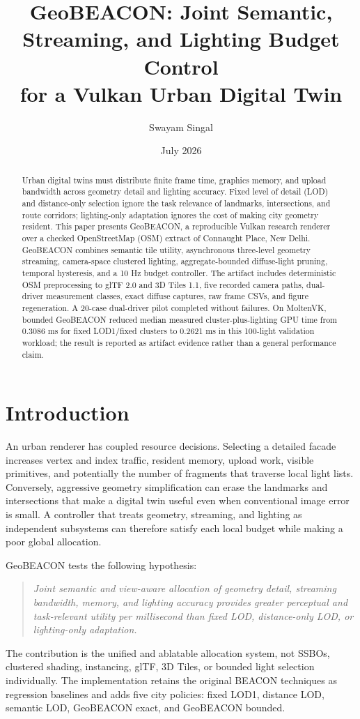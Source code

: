 \documentclass[10pt,twocolumn]{article}
\title{GeoBEACON: Joint Semantic, Streaming, and Lighting Budget Control\\
for a Vulkan Urban Digital Twin}
\author{Swayam Singal}
\date{July 2026}
\begin{document}
\maketitle

\begin{abstract}
Urban digital twins must distribute finite frame time, graphics memory, and upload bandwidth across
geometry detail and lighting accuracy. Fixed level of detail (LOD) and distance-only selection
ignore the task relevance of landmarks, intersections, and route corridors; lighting-only
adaptation ignores the cost of making city geometry resident. This paper presents GeoBEACON, a
reproducible Vulkan research renderer over a checked OpenStreetMap (OSM) extract of Connaught Place,
New Delhi. GeoBEACON combines semantic tile utility, asynchronous three-level geometry streaming,
camera-space clustered lighting, aggregate-bounded diffuse-light pruning, temporal hysteresis, and a
10 Hz budget controller. The artifact includes deterministic OSM preprocessing to glTF 2.0 and 3D
Tiles 1.1, five recorded camera paths, dual-driver measurement classes, exact diffuse captures, raw
frame CSVs, and figure regeneration. A 20-case dual-driver pilot completed without failures. On
MoltenVK, bounded GeoBEACON reduced median measured cluster-plus-lighting GPU time from 0.3086 ms for
fixed LOD1/fixed clusters to 0.2621 ms in this 100-light validation workload; the result is reported
as artifact evidence rather than a general performance claim.
\end{abstract}

\section{Introduction}
An urban renderer has coupled resource decisions. Selecting a detailed facade increases vertex and
index traffic, resident memory, upload work, visible primitives, and potentially the number of
fragments that traverse local light lists. Conversely, aggressive geometry simplification can erase
the landmarks and intersections that make a digital twin useful even when conventional image error
is small. A controller that treats geometry, streaming, and lighting as independent subsystems can
therefore satisfy each local budget while making a poor global allocation.

GeoBEACON tests the following hypothesis:
\begin{quote}
\emph{Joint semantic and view-aware allocation of geometry detail, streaming bandwidth, memory, and
lighting accuracy provides greater perceptual and task-relevant utility per millisecond than fixed
LOD, distance-only LOD, or lighting-only adaptation.}
\end{quote}
The contribution is the unified and ablatable allocation system, not SSBOs, clustered shading,
instancing, glTF, 3D Tiles, or bounded light selection individually. The implementation retains the
original BEACON techniques as regression baselines and adds five city policies: fixed LOD1,
distance LOD, semantic LOD, GeoBEACON exact, and GeoBEACON bounded.
\end{document}
